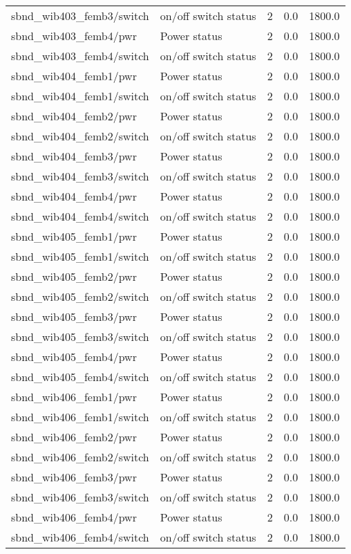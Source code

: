 \begin{center}
\begin{longtable}{l | l l l l }
sbnd\_wib403\_femb3/switch & on/off switch status & 2 & 0.0 & 1800.0\\ 
sbnd\_wib403\_femb4/pwr & Power status & 2 & 0.0 & 1800.0\\ 
sbnd\_wib403\_femb4/switch & on/off switch status & 2 & 0.0 & 1800.0\\ 
sbnd\_wib404\_femb1/pwr & Power status & 2 & 0.0 & 1800.0\\ 
sbnd\_wib404\_femb1/switch & on/off switch status & 2 & 0.0 & 1800.0\\ 
sbnd\_wib404\_femb2/pwr & Power status & 2 & 0.0 & 1800.0\\ 
sbnd\_wib404\_femb2/switch & on/off switch status & 2 & 0.0 & 1800.0\\ 
sbnd\_wib404\_femb3/pwr & Power status & 2 & 0.0 & 1800.0\\ 
sbnd\_wib404\_femb3/switch & on/off switch status & 2 & 0.0 & 1800.0\\ 
sbnd\_wib404\_femb4/pwr & Power status & 2 & 0.0 & 1800.0\\ 
sbnd\_wib404\_femb4/switch & on/off switch status & 2 & 0.0 & 1800.0\\ 
sbnd\_wib405\_femb1/pwr & Power status & 2 & 0.0 & 1800.0\\ 
sbnd\_wib405\_femb1/switch & on/off switch status & 2 & 0.0 & 1800.0\\ 
sbnd\_wib405\_femb2/pwr & Power status & 2 & 0.0 & 1800.0\\ 
sbnd\_wib405\_femb2/switch & on/off switch status & 2 & 0.0 & 1800.0\\ 
sbnd\_wib405\_femb3/pwr & Power status & 2 & 0.0 & 1800.0\\ 
sbnd\_wib405\_femb3/switch & on/off switch status & 2 & 0.0 & 1800.0\\ 
sbnd\_wib405\_femb4/pwr & Power status & 2 & 0.0 & 1800.0\\ 
sbnd\_wib405\_femb4/switch & on/off switch status & 2 & 0.0 & 1800.0\\ 
sbnd\_wib406\_femb1/pwr & Power status & 2 & 0.0 & 1800.0\\ 
sbnd\_wib406\_femb1/switch & on/off switch status & 2 & 0.0 & 1800.0\\ 
sbnd\_wib406\_femb2/pwr & Power status & 2 & 0.0 & 1800.0\\ 
sbnd\_wib406\_femb2/switch & on/off switch status & 2 & 0.0 & 1800.0\\ 
sbnd\_wib406\_femb3/pwr & Power status & 2 & 0.0 & 1800.0\\ 
sbnd\_wib406\_femb3/switch & on/off switch status & 2 & 0.0 & 1800.0\\ 
sbnd\_wib406\_femb4/pwr & Power status & 2 & 0.0 & 1800.0\\ 
sbnd\_wib406\_femb4/switch & on/off switch status & 2 & 0.0 & 1800.0\\ 

\hline
\end{longtable}
\end{center}


